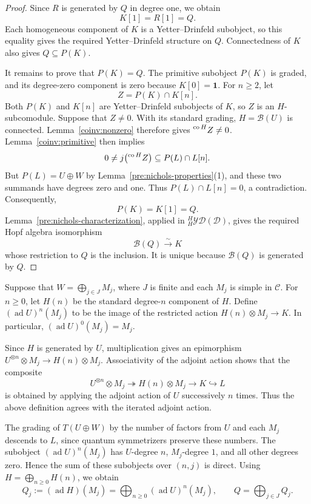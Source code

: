 \documentclass[11pt, a4paper]{article}
\numberwithin{equation}{section}
\newcommand{\C}{\mathcal C}
\newcommand{\D}{\mathcal D}
\newcommand{\B}{\mathcal B}
\newcommand{\YD}{\mathcal{YD}}
\newcommand{\one}{\mathbf 1}
\DeclareMathOperator{\ad}{ad}
\DeclareMathOperator{\co}{co}
\begin{document}
\begin{proof}
Since $R$ is generated by $Q$ in degree one, we obtain
\[
 K[1]=R[1]=Q.
\]
Each homogeneous component of $K$ is a Yetter--Drinfeld
subobject, so this equality gives the required
Yetter--Drinfeld structure on $Q$.
Connectedness of $K$ also gives $Q\subseteq P(K)$.


It remains to prove that $P(K)=Q$.
The primitive subobject $P(K)$ is graded, and its
degree-zero component is zero because $K[0]=\one$.
For $n\geq2$, let
\[
 Z=P(K)\cap K[n].
\]
Both $P(K)$ and $K[n]$ are Yetter--Drinfeld subobjects
of $K$, so $Z$ is an $H$-subcomodule.
Suppose that $Z\neq0$.
With its standard grading, $H=\B(U)$ is connected.
Lemma~\ref{coinv:nonzero} therefore gives
$\prescript{\co H}{}{Z}\neq0$.
Lemma~\ref{coinv:primitive} then implies
\[
 0\neq j\bigl(\prescript{\co H}{}{Z}\bigr)
 \subseteq P(L)\cap L[n].
\]
But $P(L)=U\oplus W$ by
Lemma~\ref{pre:nichols-properties}(1), and these two
summands have degrees zero and one.
Thus $P(L)\cap L[n]=0$, a contradiction.
Consequently,
\[
 P(K)=K[1]=Q.
\]
Lemma~\ref{pre:nichols-characterization}, applied in
${}_H^H\YD(\D)$, gives the required Hopf algebra isomorphism
\[
 \B(Q)\xrightarrow{\sim}K
\]
whose restriction to $Q$ is the inclusion.
It is unique because $\B(Q)$ is generated by $Q$.
\end{proof}

Suppose that $W=\bigoplus_{j\in J}M_j$, where $J$ is finite
and each $M_j$ is simple in $\C$.
For $n\geq0$, let $H(n)$ be the standard degree-$n$
component of $H$.
Define $(\ad U)^n(M_j)$ to be the image of the restricted
action $H(n)\otimes M_j\to K$.
In particular, $(\ad U)^0(M_j)=M_j$.

Since $H$ is generated by $U$, multiplication gives an
epimorphism $U^{\otimes n}\otimes M_j\to H(n)\otimes M_j$.
Associativity of the adjoint action shows that the composite
\begin{equation}\label{coinv:adjoint-factorization}
 U^{\otimes n}\otimes M_j
 \twoheadrightarrow H(n)\otimes M_j
 \longrightarrow K\hookrightarrow L
\end{equation}
is obtained by applying the adjoint action of $U$
successively $n$ times.
Thus the above definition agrees with the iterated
adjoint action.

The grading of $T(U\oplus W)$ by the number of factors
from $U$ and each $M_j$ descends to $L$, since quantum
symmetrizers preserve these numbers.
The subobject $(\ad U)^n(M_j)$ has $U$-degree $n$,
$M_j$-degree $1$, and all other degrees zero.
Hence the sum of these subobjects over $(n,j)$ is direct.
Using $H=\bigoplus_{n\geq0}H(n)$, we obtain
\begin{equation}\label{coinv:adjoint-components}
 Q_j:=(\ad H)(M_j)=\bigoplus_{n\geq0}(\ad U)^n(M_j),
 \qquad
 Q=\bigoplus_{j\in J}Q_j.
\end{equation}
\end{document}
